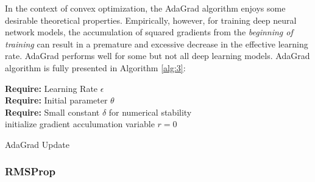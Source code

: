         In the context of convex optimization, the AdaGrad algorithm enjoys some
    desirable theoretical properties. Empirically, however, for training deep neural
    network models, the accumulation of squared gradients from the \textit{beginning of
    training} can result in a premature and excessive decrease in the effective learning
    rate. AdaGrad performs well for some but not all deep learning models. AdaGrad algorithm is fully presented in Algorithm \ref{alg:3}:
 \vspace{5mm}
    \par
            \begin{algorithm}[H]\label{alg:3}
            \textbf{Require:} Learning Rate $\epsilon$ \\
            \textbf{Require:} Initial parameter $\theta$ \\
            \textbf{Require:} Small constant $\delta $ for numerical stability \\
                initialize gradient acculumation variable $r=0$ \\
            
            \caption{AdaGrad Update}
            \end{algorithm}

    
    
    \subsubsection{RMSProp}
    
